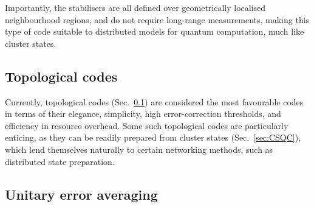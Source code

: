 Importantly, the stabilisers are all defined over geometrically localised neighbourhood regions, and do not require long-range measurements, making this type of code suitable to distributed models for quantum computation, much like cluster states.









%
%
%

\subsection{Topological codes} \label{sec:topol_codes} 


Currently, topological codes (Sec.~\ref{sec:topol_codes}) are considered the most favourable codes in terms of their elegance, simplicity, high error-correction thresholds, and efficiency in resource overhead. Some such topological codes are particularly enticing, as they can be readily prepared from cluster states (Sec.~\ref{sec:CSQC}), which lend themselves naturally to certain networking methods, such as distributed state preparation.

%
%

\subsection{Unitary error averaging} \label{sec:error_averaging}

